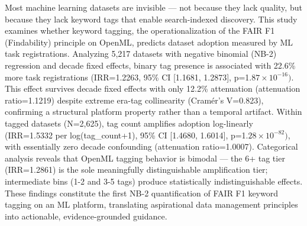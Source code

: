 
Most machine learning datasets are invisible --- not because they lack quality, but because they lack keyword tags that enable search-indexed discovery. This study examines whether keyword tagging, the operationalization of the FAIR F1 (Findability) principle on OpenML, predicts dataset adoption measured by ML task registrations. Analyzing 5,217 datasets with negative binomial (NB-2) regression and decade fixed effects, binary tag presence is associated with 22.6\% more task registrations (IRR=1.2263, 95\% CI [1.1681, 1.2873], p=1.$87\times 10^{-16})$. This effect survives decade fixed effects with only 12.2\% attenuation (attenuation ratio=1.1219) despite extreme era-tag collinearity (Cramér's V=0.823), confirming a structural platform property rather than a temporal artifact. Within tagged datasets (N=2,625), tag count amplifies adoption log-linearly (IRR=1.5332 per log(tag\_count+1), 95\% CI [1.4680, 1.6014], p=1.$28\times 10^{-82})$, with essentially zero decade confounding (attenuation ratio=1.0007). Categorical analysis reveals that OpenML tagging behavior is bimodal --- the 6+ tag tier (IRR=1.2861) is the sole meaningfully distinguishable amplification tier; intermediate bins (1-2 and 3-5 tags) produce statistically indistinguishable effects. These findings constitute the first NB-2 quantification of FAIR F1 keyword tagging on an ML platform, translating aspirational data management principles into actionable, evidence-grounded guidance.

